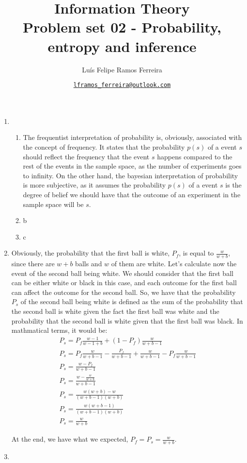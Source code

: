 \documentclass{article}
\title{Information Theory \\ \large Problem set 02 - Probability, entropy and inference}
\author{Luís Felipe Ramos Ferreira}
\date{\href{mailto:lframos\_ferreira@outlook.com}{\texttt{lframos\_ferreira@outlook.com}}
}
\begin{document}
\maketitle

\begin{enumerate}
    \item \begin{enumerate}
            \item The frequentist interpretation of probability is, obviously, associated with the concept of frequency. It states that the probability \(p(s)\) of a event \(s\) should reflect the frequency that the event \(s\) happens compared to the rest of the events in the sample space, as the number of experiments goes to infinity. On the other hand, the bayesian interpretation of probability is more subjective, as it assumes the probability \(p(s)\) of a event \(s\) is the degree of belief we should have that the outcome of an experiment in the sample space will be \(s\).
            \item b
            \item c
    \end{enumerate}

    \item Obviously, the probability that the first ball is white, \(P_f\), is equal to \(\frac{w}{w + b}\), since there are \(w + b\) balls and \(w\) of them are white. Let's calculate now the event of the second ball being white. We should consider that the first ball can be either white or black in this case, and each outcome for the first ball can affect the outcome for the second ball. So, we have that the probability \(P_s\) of the second ball being white is defined as the sum of the probability that the second ball is white given the fact the first ball was white and the probability that the second ball is white given that the first ball was black. In mathmatical terms, it would be:
    \begin{gather}
        P_s = P_f\frac{w - 1}{w - 1 + b} + (1 - P_f)\frac{w}{w + b - 1} \\
        P_s = P_f\frac{w}{w + b - 1} - \frac{P_f}{w + b - 1} + \frac{w}{w + b - 1} - P_f\frac{w}{w + b - 1} \\
        P_s = \frac{w - P_f}{w + b - 1} \\
        P_s = \frac{w - \frac{w}{w + b}}{w + b - 1} \\
        P_s = \frac{w(w + b) - w}{(w + b - 1)(w + b)} \\
        P_s = \frac{w(w + b - 1)}{(w + b - 1)(w + b)} \\
        P_s = \frac{w}{w + b} 
    \end{gather}

    At the end, we have what we expected, \(P_f = P_s = \frac{w}{w + b}\).

\item 
\end{enumerate}
\end{document}
